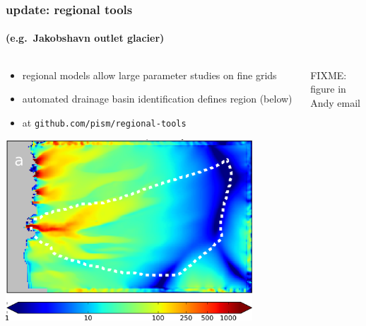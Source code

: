 \documentclass[hide notes,intlimits]{beamer}
\begin{document}
\begin{frame}
  \frametitle{update: regional tools}
  \framesubtitle{(e.g.~Jakobshavn outlet glacier)}
  
\begin{columns}
\begin{column}{0.5\textwidth}
\begin{itemize}
\vspace{-2mm}
\small
\item regional models allow large parameter studies on fine grids
\item automated drainage basin identification defines region (below)
\item \scriptsize at \texttt{github.com/pism/regional-tools}
\end{itemize}

\vspace{2mm}

  \includegraphics[width=0.85\textwidth]{jako_3km}

\end{column}

\begin{column}{0.5\textwidth}
FIXME: figure in Andy email
\end{column}
\end{columns}
\end{frame}
\end{document}
